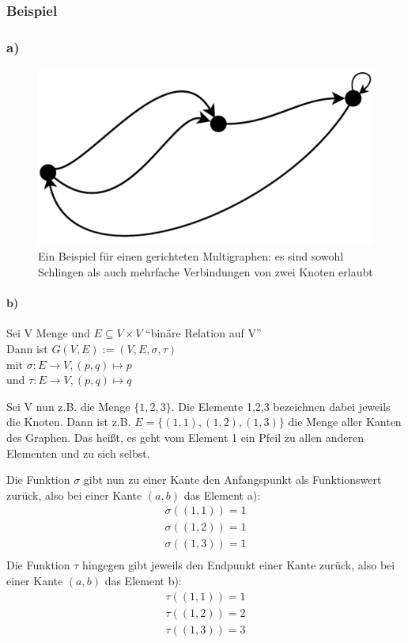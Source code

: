 \subsubsection{Beispiel}
\subsubsection*{a)}
\begin{figure}[H]
  \begin{center}
  \includegraphics[scale=0.5,keepaspectratio=true]{../bilder/multigraph_bsp.pdf}
 \end{center}
 \caption{Ein Beispiel für einen gerichteten Multigraphen: es sind sowohl Schlingen als auch mehrfache Verbindungen von zwei Knoten erlaubt}
\end{figure}

\paragraph{b)}
Sei V Menge und $E \subseteq V \times V $ ``binäre Relation auf V''
\\Dann ist $G(V,E) := (V,E, \sigma, \tau) $
\\mit $\sigma : E \rightarrow V, (p,q) \mapsto p$
\\und $\tau : E \rightarrow V, (p,q) \mapsto q$

Sei V nun z.B. die Menge $\{1,2,3\}$. Die Elemente 1,2,3 bezeichnen dabei jeweils die Knoten.
Dann ist z.B. $E = \{(1,1), (1,2), (1,3)\}$ die Menge aller Kanten des Graphen. Das heißt, es geht vom Element 1 ein Pfeil zu allen anderen Elementen und zu sich selbst.

Die Funktion $\sigma$ gibt nun zu einer Kante den Anfangspunkt als
Funktionswert zurück, also bei einer Kante $(a,b)$ das Element a):
\begin{align*}
\sigma((1,1)) = 1\\
\sigma((1,2)) = 1\\
\sigma((1,3)) = 1\\
\end{align*}
Die Funktion $\tau$ hingegen gibt jeweils den Endpunkt einer Kante
zurück, also bei einer Kante $(a,b)$ das Element b):
\begin{align*}
\tau((1,1)) = 1\\
\tau((1,2)) = 2\\
\tau((1,3)) = 3\\
\end{align*}

